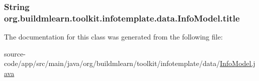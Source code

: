 \subsubsection[{\texorpdfstring{title}{title}}]{\setlength{\rightskip}{0pt plus 5cm}String org.\+buildmlearn.\+toolkit.\+infotemplate.\+data.\+Info\+Model.\+title\hspace{0.3cm}{\ttfamily [private]}}\hypertarget{classorg_1_1buildmlearn_1_1toolkit_1_1infotemplate_1_1data_1_1InfoModel_a974c9d7d4f0db00c57d5a2c38040fa27}{}\label{classorg_1_1buildmlearn_1_1toolkit_1_1infotemplate_1_1data_1_1InfoModel_a974c9d7d4f0db00c57d5a2c38040fa27}


The documentation for this class was generated from the following file\+:\begin{DoxyCompactItemize}
\item 
source-\/code/app/src/main/java/org/buildmlearn/toolkit/infotemplate/data/\hyperlink{infotemplate_2data_2InfoModel_8java}{Info\+Model.\+java}\end{DoxyCompactItemize}
